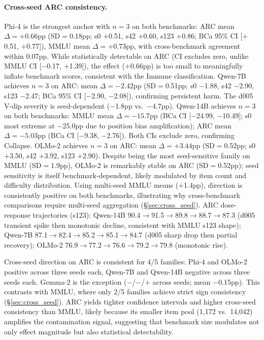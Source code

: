 \paragraph{Cross-seed ARC consistency.}
Phi-4 is the strongest anchor with $n\!=\!3$ on both benchmarks: ARC mean $\Delta = +0.66$pp (SD$=$0.18pp; s0 $+$0.51, s42 $+$0.60, s123 $+$0.86; BCa 95\% CI [$+$0.51, $+$0.77]), MMLU mean $\Delta = +0.73$pp, with cross-benchmark agreement within 0.07pp. While statistically detectable on ARC (CI excludes zero, unlike MMLU CI [$-$0.17, $+$1.39]), the effect ($+$0.66pp) is too small to meaningfully inflate benchmark scores, consistent with the Immune classification. Qwen-7B achieves $n\!=\!3$ on ARC: mean $\Delta = -2.42$pp (SD$=$0.51pp; s0 $-$1.88, s42 $-$2.90, s123 $-$2.47; BCa 95\% CI [$-$2.90, $-$2.08]), confirming persistent harm. The d005 V-dip severity is seed-dependent ($-$1.8pp vs.\ $-$4.7pp). Qwen-14B achieves $n\!=\!3$ on both benchmarks: MMLU mean $\Delta = -15.7$pp (BCa CI [$-$24.99, $-$10.49]; s0 most extreme at $-$25.0pp due to position bias amplification); ARC mean $\Delta = -5.03$pp (BCa CI [$-$9.38, $-$2.76]). Both CIs exclude zero, confirming Collapse. OLMo-2 achieves $n\!=\!3$ on ARC: mean $\Delta = +3.44$pp (SD$=$0.52pp; s0 $+$3.50, s42 $+$3.92, s123 $+$2.90). Despite being the most seed-sensitive family on MMLU (SD$=$1.9pp), OLMo-2 is remarkably stable on ARC (SD$=$0.52pp); seed sensitivity is itself benchmark-dependent, likely modulated by item count and difficulty distribution. Using multi-seed MMLU means ($+$1.4pp), direction is consistently positive on both benchmarks, illustrating why cross-benchmark comparisons require multi-seed aggregation (\S\ref{sec:cross_seed}). ARC dose-response trajectories (s123): Qwen-14B 90.4$\to$91.5$\to$89.8$\to$88.7$\to$87.3 (d005 transient spike then monotonic decline, consistent with MMLU s123 shape); Qwen-7B 87.1$\to$82.4$\to$85.2$\to$85.1$\to$84.7 (d005 sharp drop then partial recovery); OLMo-2 76.9$\to$77.2$\to$76.6$\to$79.2$\to$79.8 (monotonic rise).

Cross-seed direction on ARC is consistent for 4/5 families: Phi-4 and OLMo-2 positive across three seeds each, Qwen-7B and Qwen-14B negative across three seeds each. Gemma-2 is the exception ($-$/$-$/$+$ across seeds; mean $-$0.15pp). This contrasts with MMLU, where only 2/5 families achieve strict sign consistency (\S\ref{sec:cross_seed}). ARC yields tighter confidence intervals and higher cross-seed consistency than MMLU, likely because its smaller item pool (1{,}172 vs.\ 14{,}042) amplifies the contamination signal, suggesting that benchmark size modulates not only effect magnitude but also statistical detectability.

